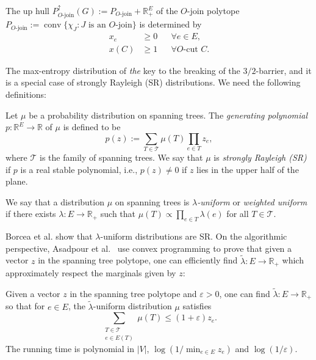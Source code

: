 \documentclass[letterpaper, reqno,12pt]{article}
\newcommand{\RR}{\mathbb{R}}
\DeclareMathOperator{\conv}{conv}
\begin{document}
\begin{theorem}
  The up hull $P_\text{$O$-join}^\uparrow(G) := P_\text{$O$-join} + \RR_+^E$ of the $O$-join polytope $P_\text{$O$-join} := \conv\{ \chi_J : \text{$J$ is an $O$-join} \}$ is determined by
  \begin{align*}
    x_e &\geq 0 && \forall e \in E, \\
    x(C) &\geq 1 && \forall \text{$O$-cut } C.
  \end{align*}
\end{theorem}

The max-entropy distribution of \emph{the} key to the breaking of the $3/2$-barrier, and it is a special case of strongly Rayleigh (SR) distributions. We need the following definitions:

\begin{definition}
  Let $\mu$ be a probability distribution on spanning trees. The \emph{generating polynomial} $p : \RR^E \to \RR$ of $\mu$ is defined to be
  $$ p(z) := \sum_{T \in \mathcal T} \mu(T) \prod_{e \in T} z_e, $$
  where $\mathcal T$ is the family of spanning trees. We say that $\mu$ is \emph{strongly Rayleigh (SR)} if $p$ is a real stable polynomial, i.e., $p(z) \neq 0$ if $z$ lies in the upper half of the plane.
\end{definition}

\begin{definition}
  We say that a distribution $\mu$ on spanning trees is \emph{$\lambda$-uniform} or \emph{weighted uniform} if there exists $\lambda : E \to \RR_+$ such that $\mu(T) \propto \prod_{e \in T} \lambda(e)$ for all $T \in \mathcal T$.
\end{definition}

Borcea et al. \cite{borcea2009negative} show that $\lambda$-uniform distributions are SR. On the algorithmic perspective, Asadpour et al.\ \cite{asadpour2017log} use convex programming to prove that given a vector $z$ in the spanning tree polytope, one can efficiently find $\tilde{\lambda} : E \to \RR_+$ which approximately respect the marginals given by $z$:

\begin{theorem}
  Given a vector $z$ in the spanning tree polytope and $\varepsilon > 0$, one can find $\tilde{\lambda} : E \to \RR_+$ so that for $e \in E$, the $\tilde{\lambda}$-uniform distribution $\mu$ satisfies
  $$ \sum_{\substack{T \in \mathcal T \\ e \in E(T)}} \mu(T) \leq (1 + \varepsilon) z_e. $$
  The running time is polynomial in $|V|$, $\log (1/\min_{e \in E} z_e)$ and $\log (1/\varepsilon)$.
\end{theorem}
\end{document}
